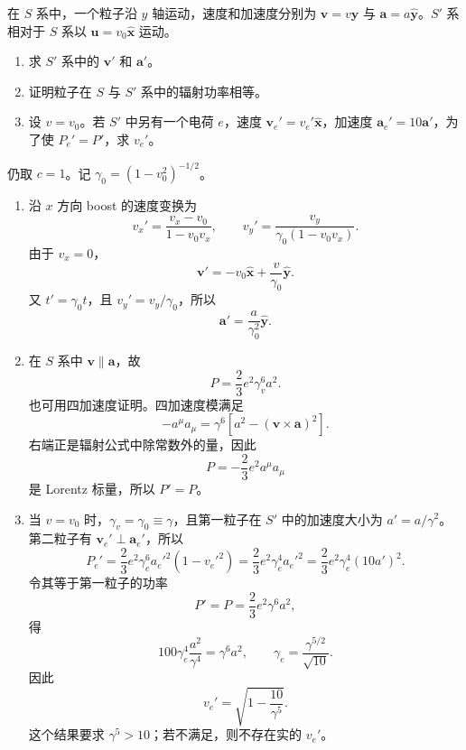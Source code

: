 \begin{question}
在 $S$ 系中，一个粒子沿 $y$ 轴运动，速度和加速度分别为 $\mathbf v=v\hat{\mathbf y}$ 与 $\mathbf a=a\hat{\mathbf y}$。$S'$ 系相对于 $S$ 系以 $\mathbf u=v_0\hat{\mathbf x}$ 运动。
\begin{enumerate}
  \item 求 $S'$ 系中的 $\mathbf v'$ 和 $\mathbf a'$。
  \item 证明粒子在 $S$ 与 $S'$ 系中的辐射功率相等。
  \item 设 $v=v_0$。若 $S'$ 中另有一个电荷 $e$，速度 $\mathbf v_e'=v_e'\hat{\mathbf x}$，加速度 $\mathbf a_e'=10\mathbf a'$，为了使 $P_e'=P'$，求 $v_e'$。
\end{enumerate}
\begin{solution}
仍取 $c=1$。记 $\gamma_0=(1-v_0^2)^{-1/2}$。
\begin{enumerate}
  \item 沿 $x$ 方向 boost 的速度变换为
  \[
    v_x'=\frac{v_x-v_0}{1-v_0v_x},
    \qquad
    v_y'=\frac{v_y}{\gamma_0(1-v_0v_x)} .
  \]
  由于 $v_x=0$，
  \[
    \boxed{\mathbf v'=-v_0\hat{\mathbf x}+\frac{v}{\gamma_0}\hat{\mathbf y}} .
  \]
  又 $t'=\gamma_0t$，且 $v_y'=v_y/\gamma_0$，所以
  \[
    \boxed{\mathbf a'=\frac{a}{\gamma_0^2}\hat{\mathbf y}} .
  \]

  \item 在 $S$ 系中 $\mathbf v\parallel\mathbf a$，故
  \[
    P=\frac23e^2\gamma_v^6a^2 .
  \]
  也可用四加速度证明。四加速度模满足
  \[
    -a^\mu a_\mu=\gamma^6[a^2-(\mathbf v\times\mathbf a)^2] .
  \]
  右端正是辐射公式中除常数外的量，因此
  \[
    P=-\frac23e^2a^\mu a_\mu
  \]
  是 Lorentz 标量，所以 $P'=P$。

  \item 当 $v=v_0$ 时，$\gamma_v=\gamma_0\equiv\gamma$，且第一粒子在 $S'$ 中的加速度大小为 $a'=a/\gamma^2$。第二粒子有 $\mathbf v_e'\perp\mathbf a_e'$，所以
  \[
    P_e'=\frac23e^2\gamma_e^6
a_e'^2(1-v_e'^2)
    =\frac23e^2\gamma_e^4a_e'^2
    =\frac23e^2\gamma_e^4(10a')^2 .
  \]
  令其等于第一粒子的功率
  \[
    P'=P=\frac23e^2\gamma^6a^2,
  \]
  得
  \[
    100\gamma_e^4\frac{a^2}{\gamma^4}=\gamma^6a^2,
    \qquad
    \gamma_e=\frac{\gamma^{5/2}}{\sqrt{10}} .
  \]
  因此
  \[
    \boxed{v_e'=\sqrt{1-\frac{10}{\gamma^5}}} .
  \]
  这个结果要求 $\gamma^5>10$；若不满足，则不存在实的 $v_e'$。
\end{enumerate}
\end{solution}
\end{question}

